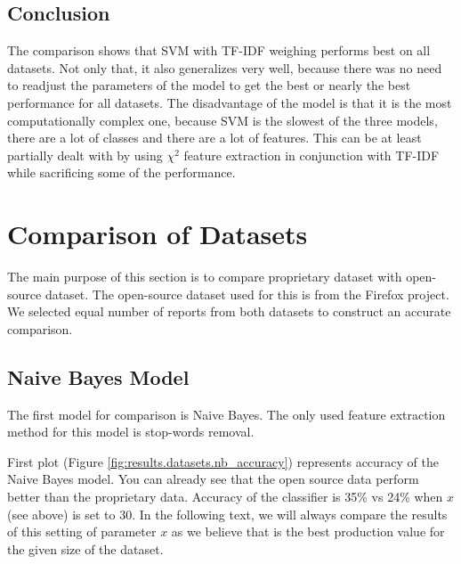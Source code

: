 \subsection{Conclusion}

The comparison shows that SVM with TF-IDF weighing performs best on all datasets. Not only that, it also generalizes very well, because there was no need to readjust the parameters of the model to get the best or nearly the best performance for all datasets. The disadvantage of the model is that it is the most computationally complex one, because SVM is the slowest of the three models, there are a lot of classes and there are a lot of features. This can be at least partially dealt with by using $\chi^2$ feature extraction in conjunction with TF-IDF while sacrificing some of the performance.

\section{Comparison of Datasets}

The main purpose of this section is to compare proprietary dataset with open-source dataset. The open-source dataset used for this is from the Firefox project. We selected equal number of reports from both datasets to construct an accurate comparison.

\subsection{Naive Bayes Model}

The first model for comparison is Naive Bayes. The only used feature extraction method for this model is stop-words removal.

First plot (Figure \ref{fig:results.datasets.nb_accuracy}) represents accuracy of the Naive Bayes model. You can already see that the open source data perform better than the proprietary data. Accuracy of the classifier is 35\% vs 24\% when $x$ (see above) is set to 30. In the following text, we will always compare the results of this setting of parameter $x$ as we believe that is the best production value for the given size of the dataset.

